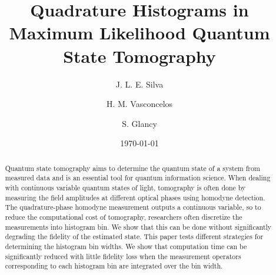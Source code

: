 \documentclass[
reprint,
superscriptaddress,
showpacs,
amsmath,
amssymb,
aps,
pra,
longbibliography
]{revtex4-1}
\begin{document}

\title{Quadrature Histograms in Maximum Likelihood Quantum State Tomography}%
\author{J. L. E. Silva}
\author{H. M. Vasconcelos}
\author{S. Glancy}


\date{\today}%

\begin{abstract}
  Quantum state tomography aims to determine the quantum state of a
  system from measured data and is an essential tool for quantum
  information science.  When dealing with continuous variable quantum
  states of light, tomography is often done by measuring
  the field amplitudes at different optical phases using homodyne
  detection.  The quadrature-phase homodyne measurement outputs a
  continuous variable, so to reduce the computational cost of
  tomography, researchers often discretize the measurements into
  histogram bin.  We show that this can be done without significantly
  degrading the fidelity of the estimated state.  This paper tests
  different strategies for determining the histogram bin
  widths. We show that computation time can be significantly reduced 
  with little fidelity loss when the measurement operators corresponding 
  to each histogram bin are integrated over the bin width.
\end{abstract}

\maketitle
\end{document}
